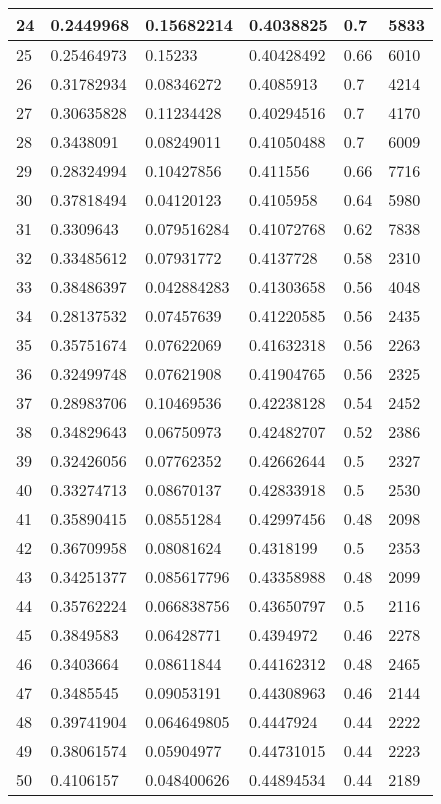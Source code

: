 \begin{longtable}{|l|l|l|l|l|l|}
24 & 0.2449968 & 0.15682214 & 0.4038825 & 0.7 & 5833 \\ \hline 
25 & 0.25464973 & 0.15233 & 0.40428492 & 0.66 & 6010 \\ \hline 
26 & 0.31782934 & 0.08346272 & 0.4085913 & 0.7 & 4214 \\ \hline 
27 & 0.30635828 & 0.11234428 & 0.40294516 & 0.7 & 4170 \\ \hline 
28 & 0.3438091 & 0.08249011 & 0.41050488 & 0.7 & 6009 \\ \hline 
29 & 0.28324994 & 0.10427856 & 0.411556 & 0.66 & 7716 \\ \hline 
30 & 0.37818494 & 0.04120123 & 0.4105958 & 0.64 & 5980 \\ \hline 
31 & 0.3309643 & 0.079516284 & 0.41072768 & 0.62 & 7838 \\ \hline 
32 & 0.33485612 & 0.07931772 & 0.4137728 & 0.58 & 2310 \\ \hline 
33 & 0.38486397 & 0.042884283 & 0.41303658 & 0.56 & 4048 \\ \hline 
34 & 0.28137532 & 0.07457639 & 0.41220585 & 0.56 & 2435 \\ \hline 
35 & 0.35751674 & 0.07622069 & 0.41632318 & 0.56 & 2263 \\ \hline 
36 & 0.32499748 & 0.07621908 & 0.41904765 & 0.56 & 2325 \\ \hline 
37 & 0.28983706 & 0.10469536 & 0.42238128 & 0.54 & 2452 \\ \hline 
38 & 0.34829643 & 0.06750973 & 0.42482707 & 0.52 & 2386 \\ \hline 
39 & 0.32426056 & 0.07762352 & 0.42662644 & 0.5 & 2327 \\ \hline 
40 & 0.33274713 & 0.08670137 & 0.42833918 & 0.5 & 2530 \\ \hline 
41 & 0.35890415 & 0.08551284 & 0.42997456 & 0.48 & 2098 \\ \hline 
42 & 0.36709958 & 0.08081624 & 0.4318199 & 0.5 & 2353 \\ \hline 
43 & 0.34251377 & 0.085617796 & 0.43358988 & 0.48 & 2099 \\ \hline 
44 & 0.35762224 & 0.066838756 & 0.43650797 & 0.5 & 2116 \\ \hline 
45 & 0.3849583 & 0.06428771 & 0.4394972 & 0.46 & 2278 \\ \hline 
46 & 0.3403664 & 0.08611844 & 0.44162312 & 0.48 & 2465 \\ \hline 
47 & 0.3485545 & 0.09053191 & 0.44308963 & 0.46 & 2144 \\ \hline 
48 & 0.39741904 & 0.064649805 & 0.4447924 & 0.44 & 2222 \\ \hline 
49 & 0.38061574 & 0.05904977 & 0.44731015 & 0.44 & 2223 \\ \hline 
50 & 0.4106157 & 0.048400626 & 0.44894534 & 0.44 & 2189 \\ \hline 
\end{longtable}